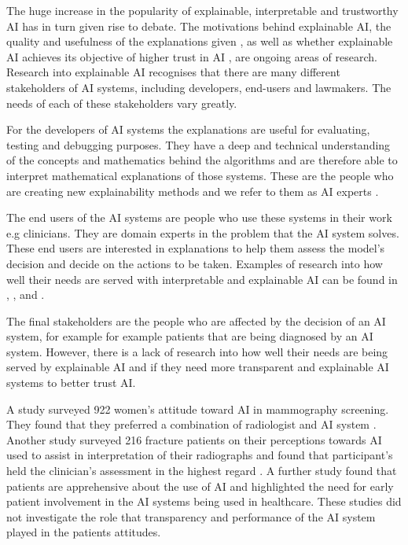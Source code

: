 \documentclass[manuscript,screen,review]{acmart}
\begin{document}
The huge increase in the popularity of explainable, interpretable and trustworthy AI has in turn given rise to debate. The motivations behind explainable AI, the quality \cite{Doshi-Velez2017} and usefulness of the explanations given \cite{Miller2019}, as well as whether explainable AI achieves its objective of higher trust in AI \cite{Lipton2018}, are ongoing areas of research. Research into explainable AI recognises that there are many different stakeholders of AI systems, including developers, end-users and lawmakers. The needs of each of these stakeholders vary greatly. 

For the developers of AI systems the explanations are useful for evaluating, testing and debugging purposes. They have a deep and technical understanding of the concepts and mathematics behind the algorithms and are therefore able to interpret mathematical explanations of those systems. These are the people who are creating new explainability methods and we refer to them as AI experts \cite{Carvalho2019}.

The end users of the AI systems are people who use these systems in their work e.g clinicians. They are domain experts in the problem that the AI system solves. These end users are interested in explanations to help them assess the model’s decision and decide on the actions to be taken. Examples of research into how well their needs are served with interpretable and explainable AI can be found in \cite{Goldstein2021}, \cite{Liao2020}, and \cite{Salimiparsa2021}.

The final stakeholders are the people who are affected by the decision of an AI system, for example for example patients that are being diagnosed by an AI system. However, there is a lack of research into how well their needs are being served by explainable AI and if they need more transparent and explainable AI systems to better trust AI.

A study surveyed 922 women’s attitude toward AI in mammography screening. They found that they preferred a combination of radiologist and AI system \cite{Ongena2021}. Another study surveyed 216 fracture patients on their perceptions towards AI used to assist in interpretation of their radiographs and found that participant’s held the clinician’s assessment in the highest regard \cite{York2020}. A further study found that patients are apprehensive about the use of AI \cite{Richardson2021} and highlighted the need for early patient involvement in the AI systems being used in healthcare. These studies did not investigate the role that transparency and performance of the AI system played in the patients attitudes.
\end{document}

